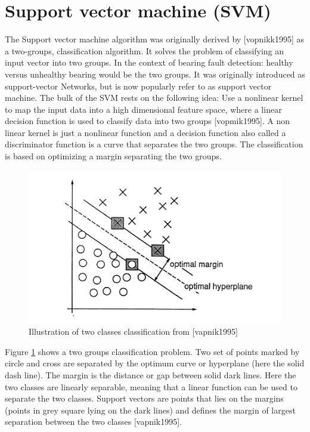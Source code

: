 \documentclass[../Main/thesis.tex]{subfiles}
\begin{document}
\section{Support vector machine (SVM)}
\label{sec:svm}
The Support vector machine algorithm was originally derived by [vopnikk1995] as a two-groups, classification algorithm. It solves the problem of classifying an input vector into two groups. In the context of bearing fault detection: healthy versus unhealthy bearing would be the two groups. It was originally introduced as support-vector Networks, but is now popularly refer to as support vector machine. The bulk of the SVM rests on the following idea: Use a nonlinear kernel to map the input data into a high dimensional feature space, where a linear decision function is used to classify data into two groups [vopmik1995].
\justify
A non linear kernel is just a nonlinear function and a decision function also called a discriminator function is a curve that separates the two groups. The classification is based on optimizing a margin separating the two groups. 
\begin{figure}[H] %
   \centering
   \includegraphics[width=5in]{../fig/svm2d.png} 
   \caption{Illustration of two classes classification from [vapnik1995]}
   \label{fig:svm2d}
\end{figure}
\justify
Figure \ref{fig:svm2d} shows a two groups classification problem. Two set of points marked by circle and cross are separated by the optimum curve or hyperplane (here the solid dash line). The margin is the distance or gap between solid dark lines. Here the two classes are linearly separable, meaning that a linear function can be used to separate the two classes. Support vectors are points that lies on the margins (points in grey square lying on the dark lines) and defines the margin of largest separation between the two classes [vapnik1995].
\end{document}

